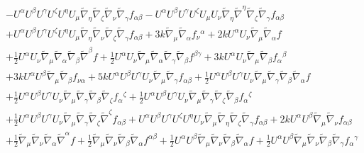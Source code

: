 \documentclass[10pt,letterpaper]{article}
\numberwithin{equation}{section}
\begin{document}
\begin{eqnarray}
&& -  U^{\alpha } U^{\beta } U^{\gamma } U^{\zeta } U^{\eta } U_{\mu } \tilde{\nabla}_{\eta }\tilde{\nabla}_{\zeta }\tilde{\nabla}_{\nu }\tilde{\nabla}_{\gamma }f_{\alpha \beta } -  U^{\alpha } U^{\beta } U^{\gamma } U^{\zeta } U_{\mu } U_{\nu } \tilde{\nabla}_{\eta }\tilde{\nabla}^{\eta }\tilde{\nabla}_{\zeta }\tilde{\nabla}_{\gamma }f_{\alpha \beta } \nonumber \\ 
&& + U^{\alpha } U^{\beta } U^{\gamma } U^{\zeta } U^{\eta } U_{\mu } \tilde{\nabla}_{\eta }\tilde{\nabla}_{\nu }\tilde{\nabla}_{\zeta }\tilde{\nabla}_{\gamma }f_{\alpha \beta } + 3 k \tilde{\nabla}_{\mu }\tilde{\nabla}_{\alpha }f_{\nu }{}^{\alpha } + 2 k U^{\alpha } U_{\nu } \tilde{\nabla}_{\mu }\tilde{\nabla}_{\alpha }f \nonumber \\ 
&& + \tfrac{1}{2} U^{\alpha } U_{\nu } \tilde{\nabla}_{\mu }\tilde{\nabla}_{\alpha }\tilde{\nabla}_{\beta }\tilde{\nabla}^{\beta }f + \tfrac{1}{2} U^{\alpha } U_{\nu } \tilde{\nabla}_{\mu }\tilde{\nabla}_{\alpha }\tilde{\nabla}_{\gamma }\tilde{\nabla}_{\beta }f^{\beta \gamma } + 3 k U^{\alpha } U_{\nu } \tilde{\nabla}_{\mu }\tilde{\nabla}_{\beta }f_{\alpha }{}^{\beta } \nonumber \\ 
&& + 3 k U^{\alpha } U^{\beta } \tilde{\nabla}_{\mu }\tilde{\nabla}_{\beta }f_{\nu \alpha } + 5 k U^{\alpha } U^{\beta } U^{\gamma } U_{\nu } \tilde{\nabla}_{\mu }\tilde{\nabla}_{\gamma }f_{\alpha \beta } + \tfrac{1}{2} U^{\alpha } U^{\beta } U^{\gamma } U_{\nu } \tilde{\nabla}_{\mu }\tilde{\nabla}_{\gamma }\tilde{\nabla}_{\beta }\tilde{\nabla}_{\alpha }f \nonumber \\ 
&& + \tfrac{1}{2} U^{\alpha } U^{\beta } U^{\gamma } U_{\nu } \tilde{\nabla}_{\mu }\tilde{\nabla}_{\gamma }\tilde{\nabla}_{\beta }\tilde{\nabla}_{\zeta }f_{\alpha }{}^{\zeta } + \tfrac{1}{2} U^{\alpha } U^{\beta } U^{\gamma } U_{\nu } \tilde{\nabla}_{\mu }\tilde{\nabla}_{\gamma }\tilde{\nabla}_{\zeta }\tilde{\nabla}_{\beta }f_{\alpha }{}^{\zeta } \nonumber \\ 
&& + \tfrac{1}{2} U^{\alpha } U^{\beta } U^{\gamma } U_{\nu } \tilde{\nabla}_{\mu }\tilde{\nabla}_{\gamma }\tilde{\nabla}_{\zeta }\tilde{\nabla}^{\zeta }f_{\alpha \beta } + U^{\alpha } U^{\beta } U^{\gamma } U^{\zeta } U^{\eta } U_{\nu } \tilde{\nabla}_{\mu }\tilde{\nabla}_{\eta }\tilde{\nabla}_{\zeta }\tilde{\nabla}_{\gamma }f_{\alpha \beta } + 2 k U^{\alpha } U^{\beta } \tilde{\nabla}_{\mu }\tilde{\nabla}_{\nu }f_{\alpha \beta } \nonumber \\ 
&& + \tfrac{1}{2} \tilde{\nabla}_{\mu }\tilde{\nabla}_{\nu }\tilde{\nabla}_{\alpha }\tilde{\nabla}^{\alpha }f + \tfrac{1}{2} \tilde{\nabla}_{\mu }\tilde{\nabla}_{\nu }\tilde{\nabla}_{\beta }\tilde{\nabla}_{\alpha }f^{\alpha \beta } + \tfrac{1}{2} U^{\alpha } U^{\beta } \tilde{\nabla}_{\mu }\tilde{\nabla}_{\nu }\tilde{\nabla}_{\beta }\tilde{\nabla}_{\alpha }f + \tfrac{1}{2} U^{\alpha } U^{\beta } \tilde{\nabla}_{\mu }\tilde{\nabla}_{\nu }\tilde{\nabla}_{\beta }\tilde{\nabla}_{\gamma }f_{\alpha }{}^{\gamma } \nonumber \\ 

\end{eqnarray}
\end{document}
